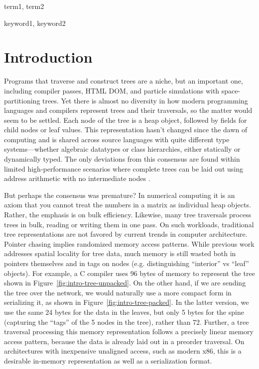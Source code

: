 \documentclass[preprint,10pt,nocopyrightspace,nonatbib]{./bibs/sigplanconf}
\begin{document}
\terms
term1, term2

\keywords
keyword1, keyword2

\section{Introduction}


Programs that traverse and construct trees are a niche, but an important one,
including compiler passes, HTML DOM, and particle simulations with
space-partitioning trees.
%
Yet there is almost no diversity in how modern programming languages and
compilers represent trees and their traversals, so the matter would seem to be
settled.
Each node of the tree is a heap object, followed by fields for child nodes or
leaf values.  This representation hasn't changed since the dawn of computing and
is shared across source languages with quite different type
systems---whether algebraic datatypes or class hierarchies, either statically or
dynamically typed.  The only deviations from this consensus are found within
limited high-performance scenarios where complete trees can be laid out using
address arithmetic with no intermediate nodes \cite{hpc-trees}.

But perhaps the consensus was premature?  In numerical computing it is an axiom
that you cannot treat the numbers in a matrix as individual heap objects.
Rather, the emphasis is on bulk efficiency.  Likewise, many tree traversals
process trees in bulk, reading or writing them in one pass.  On such workloads,
traditional tree representations are not favored by current trends in computer
architecture.  Pointer chasing implies randomized memory access patterns.
%
While previous work addresses spatial locality for tree data\cite{Chilimbi1999},
%
much memory is still wasted both in pointers themselves and in tags on nodes
(e.g. distinguishing ``interior'' vs ``leaf'' objects).  For example, a C
compiler uses 96 bytes
%
%
of memory to represent the tree shown in Figure~\ref{fig:intro-tree-unpacked}. On the other hand, if we are sending the tree over the network, we would naturally use a more compact form in serializing it, as shown in Figure~\ref{fig:intro-tree-packed}.   
In the latter version, we use the same 24 bytes for the data in the leaves, but only 5 bytes for the
spine (capturing the ``tags'' of the 5 nodes in the tree), rather than 72.  Further, a tree traversal processing this memory
representation follows a precisely linear memory access pattern, because the
data is already laid out in a preorder traversal.
%
On architectures with inexpensive unaligned access, such as modern x86, this is
a desirable in-memory representation as well as a serialization format.
\end{document}
